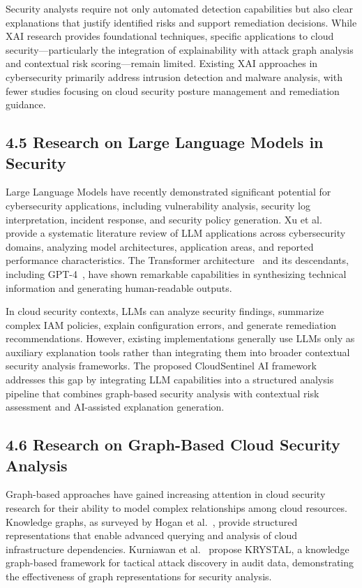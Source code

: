 Security analysts require not only automated detection capabilities but also clear explanations that justify identified risks and support remediation decisions. While XAI research provides foundational techniques, specific applications to cloud security---particularly the integration of explainability with attack graph analysis and contextual risk scoring---remain limited. Existing XAI approaches in cybersecurity primarily address intrusion detection and malware analysis, with fewer studies focusing on cloud security posture management and remediation guidance.

\subsection{4.5 Research on Large Language Models in Security}

Large Language Models have recently demonstrated significant potential for cybersecurity applications, including vulnerability analysis, security log interpretation, incident response, and security policy generation. Xu et al.~\cite{xu2024llmcybersecurity} provide a systematic literature review of LLM applications across cybersecurity domains, analyzing model architectures, application areas, and reported performance characteristics. The Transformer architecture~\cite{vaswani2017attention} and its descendants, including GPT-4~\cite{openai2023gpt4}, have shown remarkable capabilities in synthesizing technical information and generating human-readable outputs.

In cloud security contexts, LLMs can analyze security findings, summarize complex IAM policies, explain configuration errors, and generate remediation recommendations. However, existing implementations generally use LLMs only as auxiliary explanation tools rather than integrating them into broader contextual security analysis frameworks. The proposed CloudSentinel AI framework addresses this gap by integrating LLM capabilities into a structured analysis pipeline that combines graph-based security analysis with contextual risk assessment and AI-assisted explanation generation.

\subsection{4.6 Research on Graph-Based Cloud Security Analysis}

Graph-based approaches have gained increasing attention in cloud security research for their ability to model complex relationships among cloud resources. Knowledge graphs, as surveyed by Hogan et al.~\cite{hogan2021knowledge}, provide structured representations that enable advanced querying and analysis of cloud infrastructure dependencies. Kurniawan et al.~\cite{kurniawan2022krystal} propose KRYSTAL, a knowledge graph-based framework for tactical attack discovery in audit data, demonstrating the effectiveness of graph representations for security analysis.

